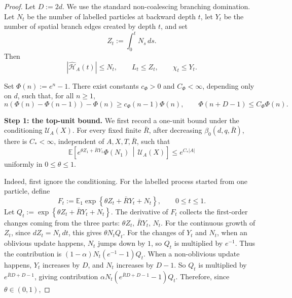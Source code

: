 \documentclass[letterpaper,11pt,reqno]{amsart}
\theoremstyle{definition}
\begin{document}
\begin{proof}
Let \(D:=2d\). We use the standard non-coalescing branching
domination. Let \(N_t\) be the number of labelled particles at backward depth
\(t\), let \(Y_t\) be the number of spatial branch edges created by depth
\(t\), and set
\[
        Z_t:=\int_0^t N_s\,ds .
\]
Then
\[
        |\widehat{\mathcal H}_A(t)|\le N_t,\qquad
        L_t\le Z_t,\qquad
        \chi_t\le Y_t .
\]

Set \(\Phi(n):=e^n-1\). There exist constants \(c_\Phi>0\) and
\(C_\Phi<\infty\), depending only on \(d\), such that, for all \(n\ge1\),
\begin{equation}\label{eq:Psi}
        n(\Phi(n)-\Phi(n-1))-\Phi(n)\ge c_\Phi(n-1)\Phi(n),
        \qquad
        \Phi(n+D-1)\le C_\Phi\Phi(n).
\end{equation}

\smallskip
\noindent\textbf{Step 1: the top-unit bound.}
We first record a one-unit bound under the conditioning \(\mathcal U_A(X)\).
For every fixed finite \(\bar R\), after decreasing
\(\beta_0(d,q,\bar R)\), there is \(C_*<\infty\), independent of
\(A,X,T,\bar R\), such that
\begin{equation}\label{eq:Q-ini}
\mathbb E\left[
        e^{\theta Z_1+\bar RY_1}\Phi(N_1)
        \,\middle|\,
        \mathcal U_A(X)
\right]
\le e^{C_*|A|}
\end{equation}
uniformly in \(0\le\theta\le1\).

Indeed, first ignore the conditioning. For the labelled process started from
one particle, define
\[
        F_t:=
        \mathbb E_1
        \exp\left\{\theta Z_t+\bar RY_t+N_t\right\},
        \qquad 0\le t\le1 .
\]
Let $Q_t:=\exp\left\{\theta Z_t+\bar RY_t+N_t\right\}$.
%
The derivative of $F_t$ collects the first-order changes coming from the three parts: $\theta Z_t,\, \bar RY_t,\, N_t$. 
%
For the continuous growth of \(Z_t\), since \(dZ_t=N_t\,dt\), this gives $\theta N_tQ_t$. 
%
For the changes of \(Y_t\) and \(N_t\), when an oblivious update happens, \(N_t\) jumps down by \(1\), so \(Q_t\) is multiplied by \(e^{-1}\). Thus the contribution is $(1-\alpha)N_t(e^{-1}-1)Q_t.$ 
When a non-oblivious update happens, \(Y_t\) increases by \(D\), and \(N_t\) increases by \(D-1\). So \(Q_t\) is multiplied by $e^{\bar RD+D-1}$, giving contribution $\alpha N_t(e^{\bar RD+D-1}-1)Q_t.$
Therefore, since $\theta\in(0,1)$,




\end{proof}
\end{document}

